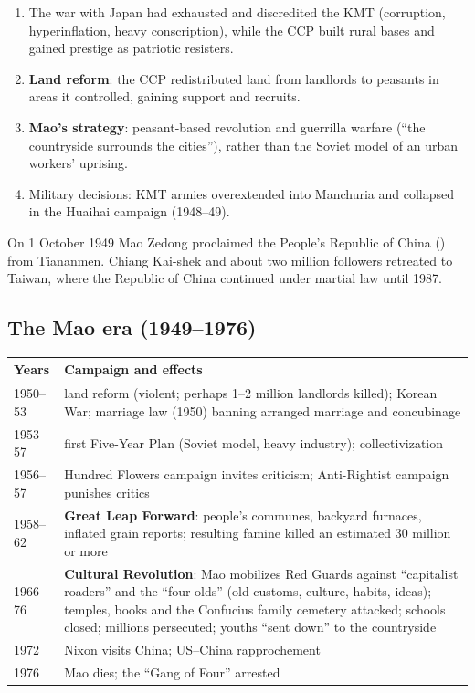 \begin{enumerate}
  \item The war with Japan had exhausted and discredited the KMT (corruption,
        hyperinflation, heavy conscription), while the CCP built rural bases and gained
        prestige as patriotic resisters.
  \item \textbf{Land reform}: the CCP redistributed land from landlords to peasants in
        areas it controlled, gaining support and recruits.
  \item \textbf{Mao's strategy}: peasant-based revolution and guerrilla warfare
        (``the countryside surrounds the cities''), rather than the Soviet model of an
        urban workers' uprising.
  \item Military decisions: KMT armies overextended into Manchuria and collapsed in the
        Huaihai campaign (1948--49).
\end{enumerate}

On 1 October 1949 Mao Zedong proclaimed the People's Republic of China ()
from Tiananmen. Chiang Kai-shek and about two million followers retreated to Taiwan, where
the Republic of China continued under martial law until 1987.

\subsection{The Mao era (1949--1976)}

\begin{center}
\begin{tabular}{lp{10.5cm}}
\toprule
Years & Campaign and effects \\
\midrule
1950--53 & land reform (violent; perhaps 1--2 million landlords killed); Korean War;
marriage law (1950) banning arranged marriage and concubinage \\
1953--57 & first Five-Year Plan (Soviet model, heavy industry); collectivization \\
1956--57 & Hundred Flowers campaign invites criticism; Anti-Rightist campaign punishes
critics \\
1958--62 & \textbf{Great Leap Forward}: people's communes, backyard furnaces, inflated
grain reports; resulting famine killed an estimated 30 million or more \\
1966--76 & \textbf{Cultural Revolution}: Mao mobilizes Red Guards against ``capitalist
roaders'' and the ``four olds'' (old customs, culture, habits, ideas); temples, books and
the Confucius family cemetery attacked; schools closed; millions persecuted; youths ``sent
down'' to the countryside \\
1972 & Nixon visits China; US--China rapprochement \\
1976 & Mao dies; the ``Gang of Four'' arrested \\
\bottomrule
\end{tabular}
\end{center}

